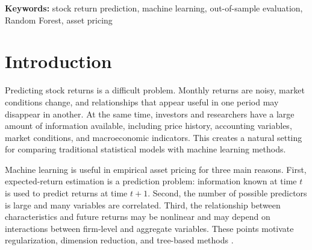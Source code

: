 \documentclass[11pt,a4paper]{article}
\begin{document}
\begin{abstract}
This project compares six models for predicting next-month stock excess
returns: a historical mean benchmark, OLS-3, Partial Least Squares, Elastic
Net, Random Forest, and Gradient Boosting. I use a monthly panel with 211,059
stock-month observations, 656 tickers, and 484 predictors from February 1990
to December 2025. Hyperparameters are selected with 15 annual expanding-window
folds spanning 2005--2019, and the selected specifications are evaluated on the
2020--2025 test sample. Random Forest performs best and reduces monthly squared
forecast error by about 0.75\% relative to the historical mean. OLS-3 provides
a very small improvement, Elastic Net reduces all coefficients to zero, and
PLS and Gradient Boosting perform worse than the benchmark. The main conclusion
is that machine learning can provide a modest improvement, but the result is
not stable across years and does not by itself imply a profitable trading
strategy.
\end{abstract}

\noindent\textbf{Keywords:} stock return prediction, machine learning,
out-of-sample evaluation, Random Forest, asset pricing

\section{Introduction}
\label{sec:introduction}

Predicting stock returns is a difficult problem. Monthly returns are noisy,
market conditions change, and relationships that appear useful in one period
may disappear in another. At the same time, investors and researchers have a
large amount of information available, including price history, accounting
variables, market conditions, and macroeconomic indicators. This creates a
natural setting for comparing traditional statistical models with machine
learning methods.

Machine learning is useful in empirical asset pricing for three main reasons.
First, expected-return estimation is a prediction problem: information known at
time \(t\) is used to predict returns at time \(t+1\). Second, the number of
possible predictors is large and many variables are correlated. Third, the
relationship between characteristics and future returns may be nonlinear and
may depend on interactions between firm-level and aggregate variables. These
points motivate regularization, dimension reduction, and tree-based methods
\parencite{gu2020empirical}.
\end{document}
